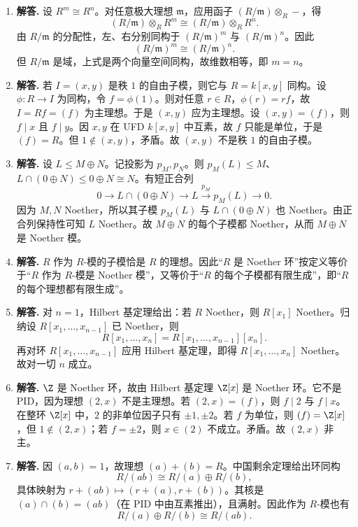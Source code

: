 \begin{enumerate}[label=\textbf{\arabic*.}, leftmargin=*, itemsep=1em]
  \item \textbf{解答.} 设 $R^m\cong R^n$。对任意极大理想 $\mathfrak m$，应用函子 $(R/\mathfrak m)\otimes_R-$，得
  \[
  (R/\mathfrak m)\otimes_R R^m\cong (R/\mathfrak m)\otimes_R R^n.
  \]
  由 $R/\mathfrak m$ 的分配性，左、右分别同构于 $(R/\mathfrak m)^m$ 与 $(R/\mathfrak m)^n$。因此
  \[
  (R/\mathfrak m)^m\cong (R/\mathfrak m)^n.
  \]
  但 $R/\mathfrak m$ 是域，上式是两个向量空间同构，故维数相等，即 $m=n$。

  \item \textbf{解答.} 若 $I=(x,y)$ 是秩 $1$ 的自由子模，则它与 $R=k[x,y]$ 同构。设 $\phi\colon R\to I$ 为同构，令 $f=\phi(1)$。则对任意 $r\in R$，$\phi(r)=rf$，故 $I=Rf=(f)$ 为主理想。于是 $(x,y)$ 应为主理想。设 $(x,y)=(f)$，则 $f\mid x$ 且 $f\mid y$。因 $x,y$ 在 UFD $k[x,y]$ 中互素，故 $f$ 只能是单位，于是 $(f)=R$。但 $1\notin(x,y)$，矛盾。故 $(x,y)$ 不是秩 $1$ 的自由子模。

  \item \textbf{解答.} 设 $L\le M\oplus N$。记投影为 $p_M,p_N$。则 $p_M(L)\le M$、$L\cap (0\oplus N)\le 0\oplus N\cong N$。有短正合列
  \[
  0\to L\cap (0\oplus N)\to L\xrightarrow{p_M} p_M(L)\to 0.
  \]
  因为 $M,N$ Noether，所以其子模 $p_M(L)$ 与 $L\cap(0\oplus N)$ 也 Noether。由正合列保持性可知 $L$ Noether。故 $M\oplus N$ 的每个子模都 Noether，从而 $M\oplus N$ 是 Noether 模。

  \item \textbf{解答.} $R$ 作为 $R$-模的子模恰是 $R$ 的理想。因此“$R$ 是 Noether 环”按定义等价于“$R$ 作为 $R$-模是 Noether 模”，又等价于“$R$ 的每个子模都有限生成”，即“$R$ 的每个理想都有限生成”。

  \item \textbf{解答.} 对 $n=1$，Hilbert 基定理给出：若 $R$ Noether，则 $R[x_1]$ Noether。归纳设 $R[x_1,\dots,x_{n-1}]$ 已 Noether，则
  \[
  R[x_1,\dots,x_n]=R[x_1,\dots,x_{n-1}][x_n].
  \]
  再对环 $R[x_1,\dots,x_{n-1}]$ 应用 Hilbert 基定理，即得 $R[x_1,\dots,x_n]$ Noether。故对一切 $n$ 成立。

  \item \textbf{解答.} $\Z$ 是 Noether 环，故由 Hilbert 基定理 $\Z[x]$ 是 Noether 环。它不是 PID，因为理想 $(2,x)$ 不是主理想。若 $(2,x)=(f)$，则 $f\mid 2$ 与 $f\mid x$。在整环 $\Z[x]$ 中，$2$ 的非单位因子只有 $\pm 1,\pm 2$。若 $f$ 为单位，则 $(f)=\Z[x]$，但 $1\notin(2,x)$；若 $f=\pm 2$，则 $x\in(2)$ 不成立。矛盾。故 $(2,x)$ 非主。

  \item \textbf{解答.} 因 $(a,b)=1$，故理想 $(a)+(b)=R$。中国剩余定理给出环同构
  \[
  R/(ab)\cong R/(a)\oplus R/(b),
  \]
  具体映射为 $r+(ab)\mapsto (r+(a),r+(b))$。其核是 $(a)\cap(b)=(ab)$（在 PID 中由互素推出），且满射。因此作为 $R$-模也有
  \[
  R/(a)\oplus R/(b)\cong R/(ab).
  \]


\end{enumerate}
